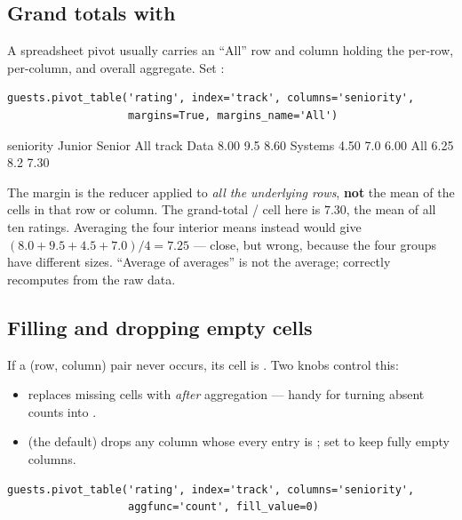 \documentclass[11pt]{article}
\begin{document}
\subsection{Grand totals with }

A spreadsheet pivot usually carries an ``All'' row and column holding the per-row, per-column, and overall aggregate. Set :

\begin{lstlisting}
guests.pivot_table('rating', index='track', columns='seniority',
                   margins=True, margins_name='All')
\end{lstlisting}

\begin{outblock}
seniority   Junior  Senior   All
track
Data          8.00     9.5  8.60
Systems       4.50     7.0  6.00
All           6.25     8.2  7.30
\end{outblock}

\begin{pitfall}
The margin is the reducer applied to \emph{all the underlying rows}, \textbf{not} the mean of the cells in that row or column. The grand-total / cell here is $7.30$, the mean of all ten ratings. Averaging the four interior means instead would give $(8.0+9.5+4.5+7.0)/4 = 7.25$ --- close, but wrong, because the four groups have different sizes. ``Average of averages'' is not the average;  correctly recomputes from the raw data.
\end{pitfall}

\subsection{Filling and dropping empty cells}

If a (row, column) pair never occurs, its cell is . Two knobs control this:

\begin{itemize}
  \item {} replaces missing cells with  \emph{after} aggregation --- handy for turning absent counts into .
  \item {} (the default) drops any column whose every entry is ; set  to keep fully empty columns.
\end{itemize}

\begin{lstlisting}
guests.pivot_table('rating', index='track', columns='seniority',
                   aggfunc='count', fill_value=0)
\end{lstlisting}
\end{document}
